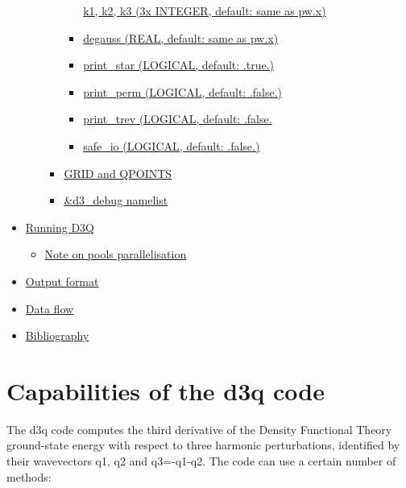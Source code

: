 \documentclass[
]{article}
\providecommand{\tightlist}{%
  \setlength{\itemsep}{0pt}\setlength{\parskip}{0pt}}
\begin{document}
\begin{itemize}
\begin{itemize}
\begin{itemize}
\begin{itemize}
        \protect\hyperlink{k1-k2-k3-3x-integer-default-same-as-pwx}{k1,
        k2, k3 (3x INTEGER, default: same as pw.x)}
      \item
        \protect\hyperlink{degauss-real-default-same-as-pwx}{degauss
        (REAL, default: same as pw.x)}
      \item
        \protect\hyperlink{print_star-logical-default-true}{print\_star
        (LOGICAL, default: .true.)}
      \item
        \protect\hyperlink{print_perm-logical-default-false}{print\_perm
        (LOGICAL, default: .false.)}
      \item
        \protect\hyperlink{print_trev-logical-default-false}{print\_trev
        (LOGICAL, default: .false.}
      \item
        \protect\hyperlink{safe_io-logical-default-false}{safe\_io
        (LOGICAL, default: .false.)}
      \end{itemize}
    \item
      \protect\hyperlink{grid-and-qpoints}{GRID and QPOINTS}
    \item
      \protect\hyperlink{d3_debug-namelist}{\&d3\_debug namelist}
    \end{itemize}
  \end{itemize}
\item
  \protect\hyperlink{running-d3q}{Running D3Q}

  \begin{itemize}
  \tightlist
  \item
    \protect\hyperlink{note-on-pools-parallelisation}{Note on pools
    parallelisation}
  \end{itemize}
\item
  \protect\hyperlink{output-format}{Output format}
\item
  \protect\hyperlink{data-flow}{Data flow}
\item
  \protect\hyperlink{bibliography}{Bibliography}
\end{itemize}

\hypertarget{capabilities-of-the-d3q-code}{%
\section{Capabilities of the d3q
code}\label{capabilities-of-the-d3q-code}}

The d3q code computes the third derivative of the Density Functional
Theory ground-state energy with respect to three harmonic perturbations,
identified by their wavevectors q1, q2 and q3=-q1-q2. The code can use a
certain number of methods:
\end{document}
